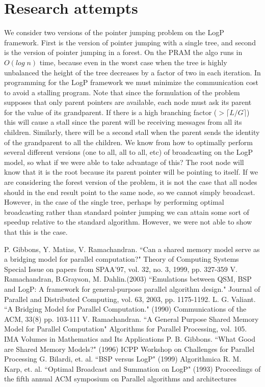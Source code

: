 \documentclass[12pt,a4paper]{article}
\begin{document}
\section{Research attempts}
We consider two versions of the pointer jumping problem on the LogP framework. First is the version of pointer jumping with a single tree, and second is the
version of pointer jumping in a forest. On the PRAM the algo runs in $O(log \; n)$ time, because even in the worst case when the tree is highly unbalanced the
height of the tree decreases by a factor of two in each iteration. In programming for the LogP framework we must minimize the communication cost to avoid a
stalling program. Note that since the formulation of the problem supposes that only parent pointers are available, each node must ask its parent for the value
of its grandparent. If there is a high branching factor ($ > \lceil L/G \rceil$) this will cause a stall since the parent will be receiving messages from all
its children. Similarly, there will be a second stall when the parent sends the identity of the grandparent to all the children. We know from \cite{Kar93} how
to optimally perform several different versions (one to all, all to all, etc) of broadcasting on the LogP model, 
so what if we were able to take advantage of this? The root node will know that it is the root because its parent pointer will be pointing to itself. 
If we are considering the forest version of the problem, it is not the case that all nodes should in the end
result point to the same node, so we cannot simply broadcast. However, in the case of the single tree, perhaps by performing optimal broadcasting rather than
standard pointer jumping we can attain some sort of speedup relative to the standard algorithm. However, we were not able to show that this is the case.

\newpage
\singlespace
\begin{thebibliography}{9}

 P. Gibbons, Y. Matias, V. Ramachandran. ``Can a shared memory model serve as a bridging model for parallel computation?" Theory of Computing Systems Special Issue on papers from SPAA'97, vol. 32, no. 3, 1999, pp. 327-359
 V. Ramachandran, B.Grayson, M. Dahlin.(2003) ``Emulations between QSM, BSP and LogP: A framework for general-purpose parallel algorithm design." Journal of Parallel and Distributed Computing, vol. 63, 2003, pp. 1175-1192. 
 L. G. Valiant. ``A Bridging Model for Parallel Computation." (1990) Communications of the ACM, 33(8) pp. 103-111
 V. Ramachandran. ``A General Purpose Shared Memory Model for Parallel Computation" Algorithms for Parallel Processing, vol. 105. IMA
Volumes in Mathematics and Its Applications
 P. B. Gibbons. ``What Good are Shared Memory Models?" (1996) ICPP Workshop on Challenges for Parallel Processing
 G. Bilardi, et. al. ``BSP versus LogP" (1999) Algorithmica 
 R. M. Karp, et. al. ``Optimal Broadcast and Summation on LogP" (1993) Proceedings of the fifth annual ACM symposium on Parallel algorithms
and architectures 

\end{thebibliography}
\end{document}
